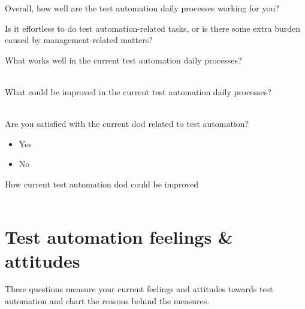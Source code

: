 \begin{question}[resume]
	\item Overall, how well are the test automation daily processes working for you?\redcross\\
	\begin{surveydescription}
		Is it effortless to do test automation-related tasks, or is there some extra burden caused by management-related matters?\\
	\end{surveydescription}
	\item What works well in the current test automation daily processes?\greencheckmark\label{survey_question:works_well_in_processes}\\\\
	\longtextfield
	\item What could be improved in the current test automation daily processes?\greencheckmark\label{survey_question:does_not_work_well_in_processes}\\\\
	\longtextfield
	\item Are you satisfied with the current \gls{dod} related to test automation?\redcross
	\begin{itemize}[noitemsep, leftmargin=1.5em]
		\renewcommand\labelitemi{\radiobutton}
		\item Yes
		\item No
	\end{itemize}
	\item How current test automation \gls{dod} could be improved\greencheckmark\label{survey_question:how_dod_can_be_improved}\\\\
	\longtextfield
\end{question}

\section*{Test automation feelings \& attitudes}
These questions measure your current feelings and attitudes towards test automation and chart the reasons behind the measures.

